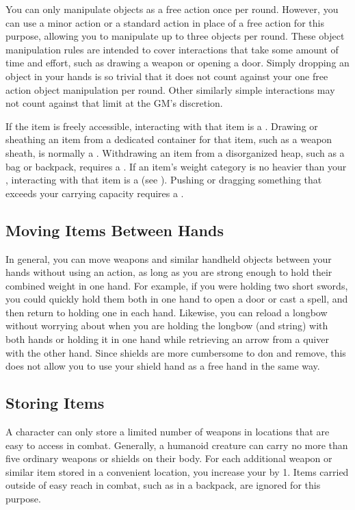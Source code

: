     You can only manipulate objects as a free action once per round.
    However, you can use a minor action or a standard action in place of a free action for this purpose, allowing you to manipulate up to three objects per round.
    These object manipulation rules are intended to cover interactions that take some amount of time and effort, such as drawing a weapon or opening a door.
    Simply dropping an object in your hands is so trivial that it does not count against your one free action object manipulation per round.
    Other similarly simple interactions may not count against that limit at the GM's discretion.

    \begin{raggeditemize}
       If the item is freely accessible, interacting with that item is a .
        Drawing or sheathing an item from a dedicated container for that item, such as a weapon sheath, is normally a .
        Withdrawing an item from a disorganized heap, such as a bag or backpack, requires a .
       If an item's weight category is no heavier than your , interacting with that item is a  (see ).
        Pushing or dragging something that exceeds your carrying capacity requires a .
    \end{raggeditemize}

  \subsection{Moving Items Between Hands}\label{Moving Items Between Hands}
    In general, you can move weapons and similar handheld objects between your hands without using an action, as long as you are strong enough to hold their combined weight in one hand.
    For example, if you were holding two short swords, you could quickly hold them both in one hand to open a door or cast a spell, and then return to holding one in each hand.
    Likewise, you can reload a longbow without worrying about when you are holding the longbow (and string) with both hands or holding it in one hand while retrieving an arrow from a quiver with the other hand.
    Since shields are more cumbersome to don and remove, this does not allow you to use your shield hand as a free hand in the same way.

  \subsection{Storing Items}\label{Storing Items}
    A character can only store a limited number of weapons in locations that are easy to access in combat.
    Generally, a humanoid creature can carry no more than five ordinary weapons or shields on their body.
    For each additional weapon or similar item stored in a convenient location, you increase your  by 1.
    Items carried outside of easy reach in combat, such as in a backpack, are ignored for this purpose.

